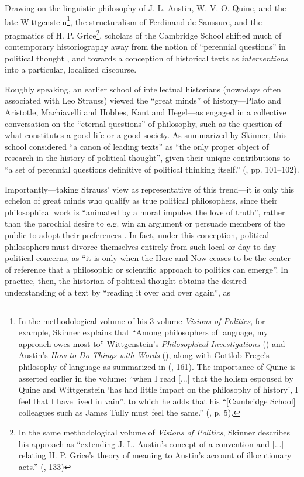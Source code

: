 \documentclass[11pt]{article}
\begin{document}
Drawing on the linguistic philosophy of J. L. Austin, W. V. O. Quine, and the late Wittgenstein\footnote{In the methodological volume of his 3-volume \textit{Visions of Politics}, for example, Skinner explains that ``Among philosophers of language, my approach owes most to'' Wittgenstein's \textit{Philosophical Investigations} (\cite{wittgenstein_philosophical_1953}) and Austin's \textit{How to Do Things with Words} (\cite{austin_how_1962}), along with Gottlob Frege's philosophy of language as summarized in \cite{dummett_frege_1973} (\cite{skinner_visions_2012}, 161). The importance of Quine is asserted earlier in the volume: ``when I read [...] that the holism espoused by Quine and Wittgenstein `has had little impact on the philosophy of history', I feel that I have lived in vain'', to which he adds that his ``[Cambridge School] colleagues such as James Tully must feel the same.'' (\cite{skinner_visions_2012}, p. 5).}, the structuralism of Ferdinand de Saussure, and the pragmatics of H. P. Grice\footnote{In the same methodological volume of \textit{Visions of Politics}, Skinner describes his approach as ``extending J. L. Austin's concept of a convention and [...] relating H. P. Grice's theory of meaning to Austin's account of illocutionary acts.'' (\cite{skinner_visions_2012}, 133)}, scholars of the Cambridge School shifted much of contemporary historiography away from the notion of ``perennial questions'' in political thought \parencite{bevir_are_1994}, and towards a conception of historical texts as \textit{interventions} into a particular, localized discourse.
	
Roughly speaking, an earlier school of intellectual historians (nowadays often associated with Leo Strauss) viewed the ``great minds'' of history---Plato and Aristotle, Machiavelli and Hobbes, Kant and Hegel---as engaged in a collective conversation on the ``eternal questions'' of philosophy, such as the question of what constitutes a good life or a good society. As summarized by Skinner, this school considered ``a canon of leading texts'' as ``the only proper object of research in the history of political thought'', given their unique contributions to ``a set of perennial questions definitive of political thinking itself.'' (\cite{skinner_liberty_1998}, pp. 101--102).

Importantly---taking Strauss' view as representative of this trend---it is only this echelon of great minds who qualify as true political philosophers, since their philosophical work is ``animated by a moral impulse, the love of truth'', rather than the parochial desire to e.g. win an argument or persuade members of the public to adopt their preferences \parencite{strauss_what_1959}. In fact, under this conception, political philosophers must divorce themselves entirely from such local or day-to-day political concerns, as ``it is only when the Here and Now ceases to be the center of reference that a philosophic or scientific approach to politics can emerge''. In practice, then, the historian of political thought obtains the desired understanding of a text by ``reading it over and over again'', as
	
\end{document}
